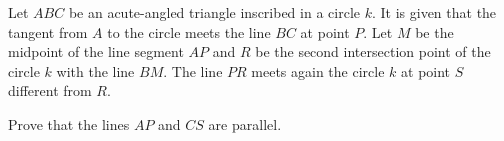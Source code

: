 Let $ABC$ be an acute-angled triangle inscribed in a circle $k$. It is given that the tangent from $A$ to the circle meets the line $BC$ at point $P$. Let $M$ be the midpoint of the line segment $AP$ and $R$ be the second intersection point of the circle $k$ with the line $BM$. The line $PR$ meets again the circle $k$ at point $S$ different from $R$.

Prove that the lines $AP$ and $CS$ are parallel.